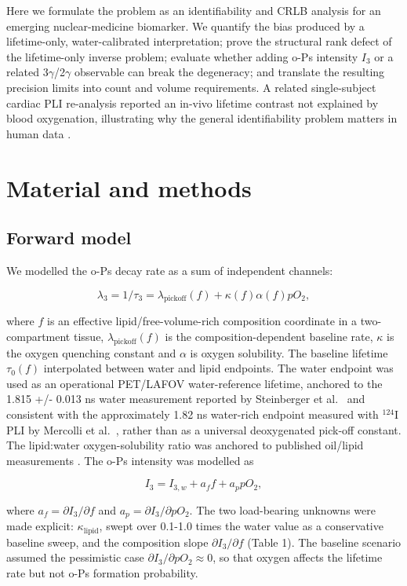 \documentclass[pdflatex,sn-mathphys-num]{sn-jnl}
\begin{document}
Here we formulate the problem as an identifiability and CRLB analysis for an emerging nuclear-medicine biomarker. We quantify the bias produced by a lifetime-only, water-calibrated interpretation; prove the structural rank defect of the lifetime-only inverse problem; evaluate whether adding o-Ps intensity \(I_3\) or a related 3\(\gamma\)/2\(\gamma\) observable can break the degeneracy; and translate the resulting precision limits into count and volume requirements. A related single-subject cardiac PLI re-analysis reported an in-vivo lifetime contrast not explained by blood oxygenation, illustrating why the general identifiability problem matters in human data \cite{ref13}.

\section{Material and methods}\label{material-and-methods}

\subsection{Forward model}\label{forward-model}

We modelled the o-Ps decay rate as a sum of independent channels:

\[ \lambda_3 = 1/\tau_3 = \lambda_{\mathrm{pickoff}}(f) + \kappa(f)\alpha(f)pO_2, \]

where \(f\) is an effective lipid/free-volume-rich composition coordinate in a two-compartment tissue, \(\lambda_{\mathrm{pickoff}}(f)\) is the composition-dependent baseline rate, \(\kappa\) is the oxygen quenching constant and \(\alpha\) is oxygen solubility. The baseline lifetime \(\tau_0(f)\) interpolated between water and lipid endpoints. The water endpoint was used as an operational PET/LAFOV water-reference lifetime, anchored to the 1.815 +/- 0.013 ns water measurement reported by Steinberger et al.~\cite{ref14} and consistent with the approximately 1.82 ns water-rich endpoint measured with \(^{124}\)I PLI by Mercolli et al.~\cite{ref15}, rather than as a universal deoxygenated pick-off constant. The lipid:water oxygen-solubility ratio was anchored to published oil/lipid measurements \cite{ref16,ref17}. The o-Ps intensity was modelled as

\[ I_3 = I_{3,w} + a_f f + a_p pO_2, \]

where \(a_f=\partial I_3/\partial f\) and \(a_p=\partial I_3/\partial pO_2\). The two load-bearing unknowns were made explicit: \(\kappa_{\mathrm{lipid}}\), swept over 0.1-1.0 times the water value as a conservative baseline sweep, and the composition slope \(\partial I_3/\partial f\) (Table 1). The baseline scenario assumed the pessimistic case \(\partial I_3/\partial pO_2 \approx 0\), so that oxygen affects the lifetime rate but not o-Ps formation probability.
\end{document}
